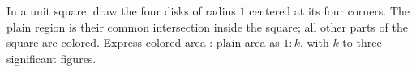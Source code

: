 In a unit square, draw the four disks of radius $1$ centered at its four corners. The plain region is their common intersection inside the square; all other parts of the square are colored. Express colored area : plain area as $1:k$, with $k$ to three significant figures.
